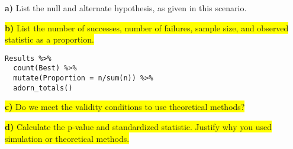 \documentclass{article}
\newif\ifPrintSolution
\newcommand{\sol}[1]{\ifPrintSolution {\color{blue} #1 } \fi}
\begin{document}
\hspace{0.1in} \textbf{a) } List the null and alternate hypothesis, as given in this scenario.

\sol{$H_0: \pi = \frac{1}{3}$. The true long-run proportion of cadets who prefer CPT Rocha's cookies when given the choice between homemade, Chips Ahoy, and Keebler is $\frac{1}{3}$\\
$H_a: \pi > \frac{1}{3}$. The true long-run proportion of cadets who prefer CPT Rocha's cookies when given the choice between homemade, Chips Ahoy, and Keebler is greater than $\frac{1}{3}$}

\vspace{0.25in}

\hspace{0.1in} \colorbox{yellow}{\textbf{b) } List the number of successes, number of failures, sample size, and observed statistic as a proportion.}

\sol{Number of ``successes" = 50\\
Number of ``failures" = 17\\
\textit{n} = 67\\
$\hat{p} = \frac{50}{67} = 0.746$}

\color{blue}
\begin{verbatim}
Results %>% 
  count(Best) %>% 
  mutate(Proportion = n/sum(n)) %>% 
  adorn_totals()
\end{verbatim}
\color{black}

\vspace{0.25in}

\hspace{0.1in} \colorbox{yellow}{\textbf{c) } Do we meet the validity conditions to use theoretical methods?}

\sol{Yes, we have at least 10 successes and 10 failures.}

\vspace{0.25in}

\hspace{0.1in} \colorbox{yellow}{\textbf{d) } Calculate the p-value and standardized statistic. Justify why you used simulation or theoretical methods.}

\sol{$z = 7.170108\\
p-value = 3.747e^{-13}$\\
We used theoretical methods because we met our validity conditions.}

\end{document}

